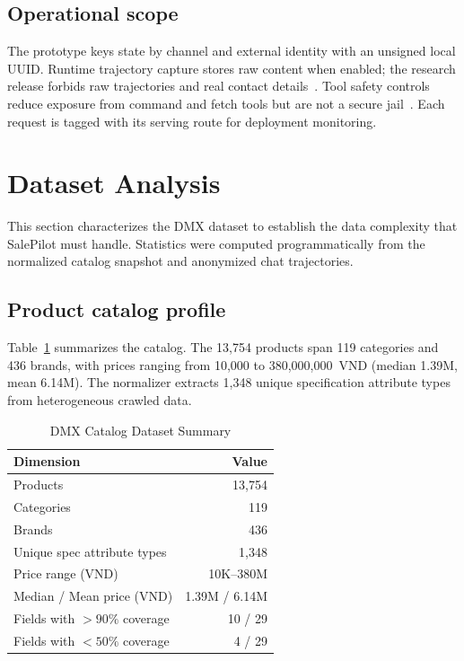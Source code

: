 \documentclass[conference,a4paper]{IEEEtran}
\begin{document}
\subsection{Operational scope}
The prototype keys state by channel and external identity with an unsigned local UUID. Runtime trajectory capture stores raw content when enabled; the research release forbids raw trajectories and real contact details~\cite{nist2020privacy}. Tool safety controls reduce exposure from command and fetch tools but are not a secure jail~\cite{greshake2023indirect}. Each request is tagged with its serving route for deployment monitoring.

\section{Dataset Analysis}
This section characterizes the DMX dataset to establish the data complexity that SalePilot must handle. Statistics were computed programmatically from the normalized catalog snapshot and anonymized chat trajectories.

\subsection{Product catalog profile}
Table~\ref{tab_dataset} summarizes the catalog. The 13{,}754 products span 119 categories and 436 brands, with prices ranging from 10{,}000 to 380{,}000{,}000~VND (median 1.39M, mean 6.14M). The normalizer extracts 1{,}348 unique specification attribute types from heterogeneous crawled data.

\begin{table}[htbp]
\caption{DMX Catalog Dataset Summary}
\begin{center}
\footnotesize
\begin{tabular}{|l|r|}
\hline
\textbf{Dimension} & \textbf{Value} \\
\hline
Products & 13{,}754 \\
Categories & 119 \\
Brands & 436 \\
Unique spec attribute types & 1{,}348 \\
Price range (VND) & 10K--380M \\
Median / Mean price (VND) & 1.39M / 6.14M \\
Fields with ${>}90\%$ coverage & 10 / 29 \\
Fields with ${<}50\%$ coverage & 4 / 29 \\
\hline
\end{tabular}
\label{tab_dataset}
\end{center}
\end{table}
\end{document}
